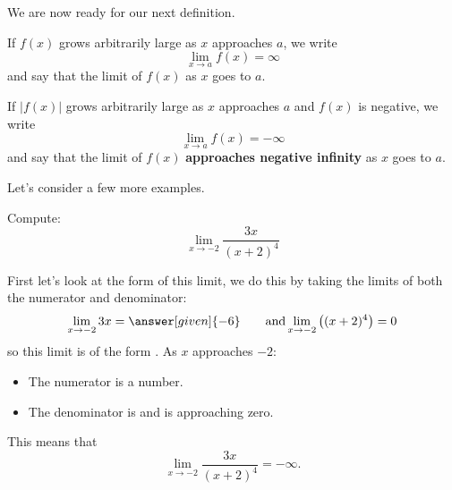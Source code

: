 \documentclass{ximera}
\begin{document}
We are now ready for our next definition.

\begin{definition}
If $f(x)$ grows arbitrarily large as $x$ approaches $a$, we write
\[
\lim_{x\to a} f(x) = \infty
\]
and say that the limit of $f(x)$  as $x$
goes to $a$.

If $|f(x)|$ grows arbitrarily large as $x$ approaches $a$ and $f(x)$ is
negative, we write
\[
\lim_{x\to a} f(x) = -\infty
\]
and say that the limit of $f(x)$ \textbf{approaches negative infinity}
as $x$ goes to $a$.
\end{definition}

Let's consider a few more examples.

\begin{example}
  Compute:
  \[
  \lim_{x\to -2} \frac{3x}{(x+2)^4}
  \]
  \begin{explanation}
    First let's look at the form of this limit, we do this by taking the limits of both the numerator and denominator:
    \[
    \lim_{x\to -2} 3x = \answer[given]{-6}\qquad\text{and}\lim_{x\to-2}\left((x+2)^4\right) = 0
    \]
    so this limit is of the form \numOverZero.  As $x$ approaches $-2$:
    \begin{itemize}
    \item The numerator is a  number. 
    \item The denominator is  and is approaching zero.
    \end{itemize}
    This means that
    \[
    \lim_{x\to -2} \frac{3x}{(x+2)^4} = -\infty.
    \]
  \end{explanation}
\end{example}
\end{document}
